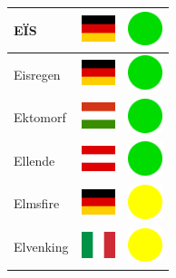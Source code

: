 \documentclass[12pt, a4paper, twoside]{report}
\begin{document}
\begin{center}
\begin{longtable}{|p{5cm}|p{2cm}|p{2cm}|}
 EÏS                                                        & \includegraphics[width=1cm]{../img/flags/de} &   \includegraphics[width=1cm]{../likes/y} \\ \hline
 Eisregen                                                   & \includegraphics[width=1cm]{../img/flags/de} &   \includegraphics[width=1cm]{../likes/y} \\ \hline
 Ektomorf                                                   & \includegraphics[width=1cm]{../img/flags/hu} &   \includegraphics[width=1cm]{../likes/y} \\ \hline
 Ellende                                                    & \includegraphics[width=1cm]{../img/flags/at} &   \includegraphics[width=1cm]{../likes/y} \\ \hline
 Elmsfire                                                   & \includegraphics[width=1cm]{../img/flags/de} &   \includegraphics[width=1cm]{../likes/m} \\ \hline
 Elvenking                                                  & \includegraphics[width=1cm]{../img/flags/it} &   \includegraphics[width=1cm]{../likes/m} \\ \hline

\end{longtable}
\end{center}
\end{document}
